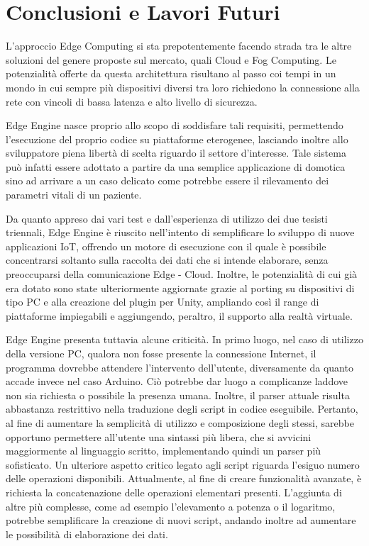 \chapter{Conclusioni e Lavori Futuri}
L’approccio Edge Computing si sta prepotentemente facendo strada tra le altre soluzioni del genere proposte sul mercato, quali Cloud e Fog Computing. Le potenzialità offerte da questa architettura risultano al passo coi tempi in un mondo in cui sempre più dispositivi diversi tra loro richiedono la connessione alla rete con vincoli di bassa latenza e alto livello di sicurezza. 

Edge Engine nasce proprio allo scopo di soddisfare tali requisiti, permettendo l’esecuzione del proprio codice su piattaforme eterogenee, lasciando inoltre allo sviluppatore piena libertà di scelta riguardo il settore d’interesse. Tale sistema può infatti essere adottato a partire da una semplice applicazione di domotica sino ad arrivare a un caso delicato come potrebbe essere il rilevamento dei parametri vitali di un paziente.

Da quanto appreso dai vari test e dall'esperienza di utilizzo dei due tesisti triennali, Edge Engine è riuscito nell’intento di semplificare lo sviluppo di nuove applicazioni IoT, offrendo un motore di esecuzione con il quale è possibile concentrarsi soltanto sulla raccolta dei dati che si intende elaborare, senza preoccuparsi della comunicazione Edge - Cloud.  Inoltre, le potenzialità di cui già era dotato sono state ulteriormente aggiornate grazie al porting su dispositivi di tipo PC e alla creazione del plugin per Unity, ampliando così il range di piattaforme impiegabili e aggiungendo, peraltro, il supporto alla realtà virtuale.

Edge Engine presenta tuttavia alcune criticità. In primo luogo, nel caso di utilizzo della versione PC, qualora non fosse presente la connessione Internet, il programma dovrebbe attendere l’intervento dell'utente, diversamente da quanto accade invece nel caso Arduino. Ciò potrebbe dar luogo a complicanze laddove non sia richiesta o possibile la presenza umana. Inoltre, il parser attuale risulta abbastanza restrittivo nella traduzione degli script in codice eseguibile. Pertanto, al fine di aumentare la semplicità di utilizzo e composizione degli stessi, sarebbe opportuno permettere all'utente una sintassi più libera, che si avvicini maggiormente al linguaggio scritto, implementando quindi un parser più sofisticato. Un ulteriore aspetto critico legato agli script riguarda l’esiguo numero delle operazioni disponibili. Attualmente, al fine di creare funzionalità avanzate, è richiesta la concatenazione delle operazioni elementari presenti. L’aggiunta di altre più complesse, come ad esempio l’elevamento a potenza o il logaritmo, potrebbe semplificare la creazione di nuovi script, andando inoltre ad aumentare le possibilità di elaborazione dei dati.

